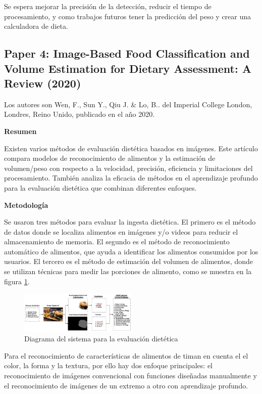 \thinspace
Se espera mejorar la precisión de la detección, reducir el tiempo de procesamiento, y como trabajos futuros tener la predicción del peso y crear una calculadora de dieta.

\subsection{Paper 4: Image-Based Food Classification and Volume Estimation for Dietary Assessment: A Review (2020)}

Los autores son  Wen, F., Sun Y., Qiu J. \& Lo, B.. del Imperial College London, Londres, Reino Unido, publicado en el año 2020. \parencite{lo2020image}

\textbf{Resumen}

\thinspace
Existen varios métodos de evaluación dietética basados en imágenes. Este artículo compara modelos de reconocimiento de alimentos y la estimación de volumen/peso con respecto a la velocidad, precisión, eficiencia y limitaciones del procesamiento. También analiza la eficacia de métodos en el aprendizaje profundo para la evaluación dietética que combinan diferentes enfoques.

\textbf{Metodología}

\thinspace
Se usaron tres métodos para evaluar la ingesta dietética. El primero es el método de datos donde se localiza alimentos en imágenes y/o videos para reducir el almacenamiento de memoria. El segundo es el método de reconocimiento automático de alimentos, que ayuda a identificar los alimentos consumidos por los usuarios. El tercero es el método de estimación del volumen de alimentos, donde se utilizan técnicas para medir las porciones de alimento, como se muestra en la figura \ref{fig14}.

\begin{figure}[h]
		\begin{center}
			\includegraphics[width=0.5\textwidth]{2/imagen2/15FIGURA15PAPER4.JPG}
	        \caption{Diagrama del sistema para la evaluación dietética}
			\label{fig14}
		\end{center}
		
	\end{figure}

Para el reconocimiento de características de alimentos de timan en cuenta el el color, la forma y la textura, por ello hay dos enfoque principales: el reconocimiento de imágenes convencional con funciones diseñadas manualmente y el reconocimiento de imágenes de un extremo a otro con aprendizaje profundo.


